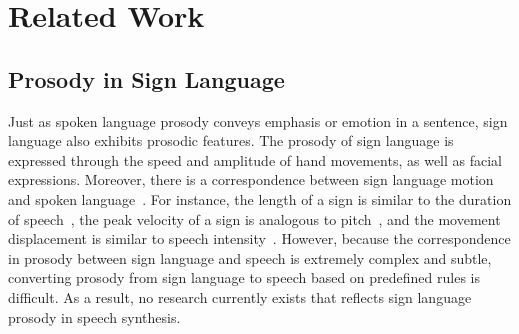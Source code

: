 \section{Related Work}
\label{sec:related_work}
\subsection{Prosody in Sign Language}
Just as spoken language prosody conveys emphasis or emotion in a sentence, sign language also exhibits prosodic features. The prosody of sign language is expressed through  the speed and amplitude of hand movements, as well as facial expressions. Moreover, there is a correspondence between sign language motion and spoken language~\cite{Brentari2015The}. For instance, the length of a sign is similar to the duration of speech~\cite{Wilbur1999}, the peak velocity of a sign is analogous to pitch~\cite{Limousin2010}, and the movement displacement is similar to speech intensity~\cite{Wilbur1999}. However, because the correspondence in prosody between sign language and speech is extremely complex and subtle, converting prosody from sign language to speech based on predefined rules is difficult. As a result, no research currently exists that reflects sign language prosody in speech synthesis.


